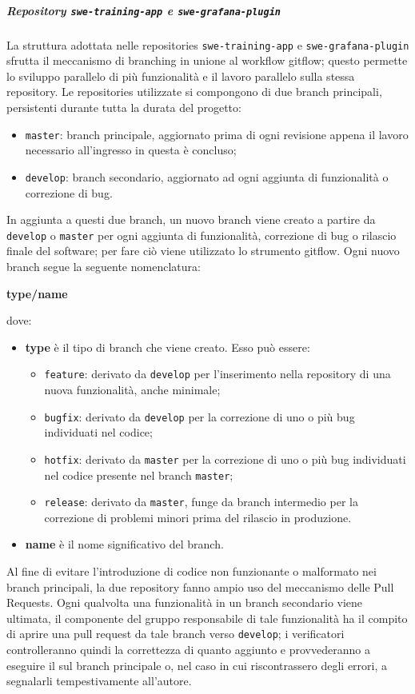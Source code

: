 \documentclass[../norme-di-progetto.tex]{subfiles}
\begin{document}
\subparagraph{Repository \texttt{swe-training-app} e \texttt{swe-grafana-plugin}}
La struttura adottata nelle repositories \texttt{swe-training-app} e \texttt{swe-grafana-plugin} sfrutta il meccanismo di branching in unione al workflow gitflow; questo permette lo sviluppo parallelo di più funzionalità e il lavoro parallelo sulla stessa repository. Le repositories utilizzate si compongono di due branch principali, persistenti durante tutta la durata del progetto:
\begin{itemize}
  \item \texttt{master}: branch principale, aggiornato prima di ogni revisione appena il lavoro necessario all'ingresso in questa è concluso;
  \item \texttt{develop}: branch secondario, aggiornato ad ogni aggiunta di funzionalità o correzione di bug.
\end{itemize}
In aggiunta a questi due branch, un nuovo branch viene creato a partire da \texttt{develop} o \texttt{master} per ogni aggiunta di funzionalità, correzione di bug o rilascio finale del software; per fare ciò viene utilizzato lo strumento gitflow. Ogni nuovo branch segue la seguente nomenclatura:
\begin{center}
  \centering
  \textbf{type/name}
\end{center} dove:
\begin{itemize}
  \item \textbf{type} è il tipo di branch che viene creato. Esso può essere:
  \begin{itemize}
    \item \texttt{feature}: derivato da \texttt{develop} per l'inserimento nella repository di una nuova funzionalità, anche minimale;
    \item \texttt{bugfix}: derivato da \texttt{develop} per la correzione di uno o più bug individuati nel codice;
    \item \texttt{hotfix}: derivato da \texttt{master} per la correzione di uno o più bug individuati nel codice presente nel branch \texttt{master};
    \item \texttt{release}: derivato da \texttt{master}, funge da branch intermedio per la correzione di problemi minori prima del rilascio in produzione.
  \end{itemize}
  \item \textbf{name} è il nome significativo del branch.
\end{itemize}
Al fine di evitare l'introduzione di codice non funzionante o malformato nei branch principali, la due repository fanno ampio uso del meccanismo delle Pull Requests. Ogni qualvolta una funzionalità in un branch secondario viene ultimata, il componente del gruppo responsabile di tale funzionalità ha il compito di aprire una pull request da tale branch verso \texttt{develop}; i verificatori controlleranno quindi la correttezza di quanto aggiunto e provvederanno a eseguire il  sul branch principale o, nel caso in cui riscontrassero degli errori, a segnalarli tempestivamente all'autore.
\end{document}
